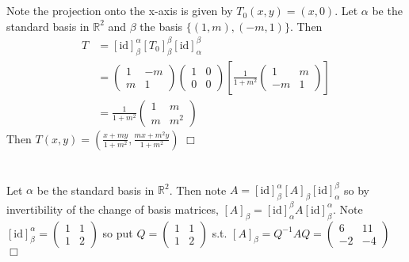 \documentclass{article}
\begin{document}
\section{}
Note the projection onto the x-axis is given by $T_0(x,y) = (x,0)$. Let $\alpha$ be the standard basis in $\mathbb{R}^2$ and $\beta$ the basis $\{(1,m), (-m,1)\}$. Then 
\begin{equation*}
    \begin{split}
        T &= [\textrm{id}]_\beta^\alpha [T_0]_\beta^\beta [\textrm{id}]_\alpha^\beta\\
        &= \left(\begin{matrix}1&-m\\m&1\end{matrix}\right) \left(\begin{matrix}1&0\\0&0\end{matrix}\right) \left[ \frac{1}{1+m^2} \left(\begin{matrix}1&m\\-m&1\end{matrix}\right) \right]\\
        &= \frac{1}{1+m^2} \left(\begin{matrix}1&m\\m&m^2\end{matrix}\right)
    \end{split}
\end{equation*}
Then $T(x,y) = (\frac{x + my}{1+m^2}, \frac{mx + m^2y}{1+m^2})$ $\Box$

\section{}
Let $\alpha$ be the standard basis in $\mathbb{R}^2$. Then note $A = [\textrm{id}]_\beta^\alpha [A]_\beta [\textrm{id}]_\alpha^\beta$ so by invertibility of the change of basis matrices, $[A]_\beta = [\textrm{id}]_\alpha^\beta A [\textrm{id}]_\beta^\alpha$. Note $[\textrm{id}]_\beta^\alpha = \left(\begin{matrix}1&1\\1&2\end{matrix}\right)$ so put $Q = \left(\begin{matrix}1&1\\1&2\end{matrix}\right)$ s.t. $[A]_\beta = Q^{-1}AQ =\left(\begin{matrix}6&11\\-2&-4\end{matrix}\right)$ $\Box$
\end{document}
